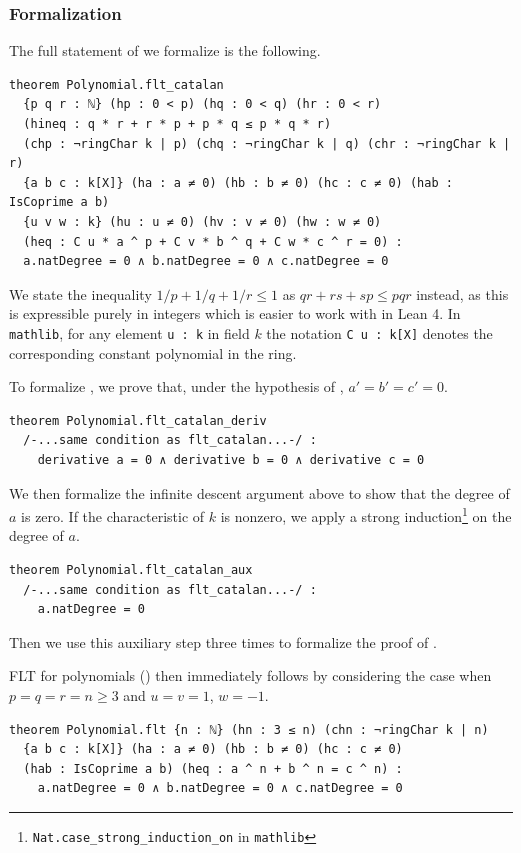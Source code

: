 \documentclass[runningheads]{llncs}
\begin{document}
\subsubsection{Formalization}

The full statement of  we formalize is the following.

\begin{verbatim}
theorem Polynomial.flt_catalan
  {p q r : ℕ} (hp : 0 < p) (hq : 0 < q) (hr : 0 < r)
  (hineq : q * r + r * p + p * q ≤ p * q * r)
  (chp : ¬ringChar k | p) (chq : ¬ringChar k | q) (chr : ¬ringChar k | r)
  {a b c : k[X]} (ha : a ≠ 0) (hb : b ≠ 0) (hc : c ≠ 0) (hab : IsCoprime a b)
  {u v w : k} (hu : u ≠ 0) (hv : v ≠ 0) (hw : w ≠ 0)
  (heq : C u * a ^ p + C v * b ^ q + C w * c ^ r = 0) :
  a.natDegree = 0 ∧ b.natDegree = 0 ∧ c.natDegree = 0
\end{verbatim}

We state the inequality $1 / p + 1/q + 1/r \leq 1$ 
as $qr + rs + sp \leq pqr$ instead, as this is expressible purely in integers which is easier to work with in Lean 4.
In \texttt{mathlib}, for any element \texttt{u : k} in field $k$ the notation \texttt{C u : k[X]} denotes the corresponding constant polynomial in the ring.

To formalize , we prove that, under the hypothesis of , $a' = b' = c' = 0$.
\begin{verbatim}
theorem Polynomial.flt_catalan_deriv
  /-...same condition as flt_catalan...-/ :
    derivative a = 0 ∧ derivative b = 0 ∧ derivative c = 0
\end{verbatim}

We then formalize the infinite descent argument above to show that the degree of $a$ is zero.
If the characteristic of $k$ is nonzero, we apply a strong induction\footnote{\texttt{Nat.case\_strong\_induction\_on} in \texttt{mathlib}} on the degree of $a$.
\begin{verbatim}
theorem Polynomial.flt_catalan_aux
  /-...same condition as flt_catalan...-/ :
    a.natDegree = 0
\end{verbatim}
Then we use this auxiliary step three times to formalize the proof of .

FLT for polynomials () then immediately follows by considering the case when $p = q = r = n \geq 3$ and $u = v = 1$, $w = -1$.

\begin{verbatim}
theorem Polynomial.flt {n : ℕ} (hn : 3 ≤ n) (chn : ¬ringChar k | n)
  {a b c : k[X]} (ha : a ≠ 0) (hb : b ≠ 0) (hc : c ≠ 0) 
  (hab : IsCoprime a b) (heq : a ^ n + b ^ n = c ^ n) :
    a.natDegree = 0 ∧ b.natDegree = 0 ∧ c.natDegree = 0
\end{verbatim}
\end{document}
